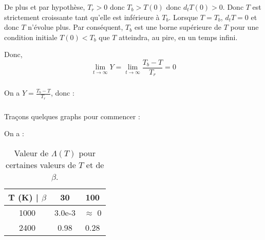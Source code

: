 \documentclass[10pt,a4paper]{report}
\begin{document}
De plus et par hypothèse, $T_r > 0$ donc $T_b > T(0)$ donc $d_t T(0) > 0$. Donc $T$ est strictement croissante tant qu'elle est inférieure à $T_b$. Lorsque $T = T_b$, $d_t T = 0$ et donc $T$ n'évolue plus. Par conséquent, $T_b$ est une borne supérieure de $T$ pour une condition initiale $T(0) < T_b$ que $T$ atteindra, au pire, en un temps infini.

Donc, 
$$\lim_{t \rightarrow \infty} Y = \lim_{t \rightarrow \infty} \frac{T_b-T}{T_r} = 0 $$

\subsubsection{} %

On a $Y= \frac{T_b-T}{T_r}$, donc :


\subsubsection{}%

Traçons quelques graphs pour commencer : 


On a : 

\begin{table}[H]
	\begin{center}
	\begin{tabular}{|c|c|c|}
 		\hline
 		T (K) | $\beta$ & 30 & 100 \\ 
 		\hline
 		1000 & 3.0e-3 & $\approx$ 0 \\ 
 		\hline
 		2400 & 0.98 & 0.28  \\
 		\hline
	\end{tabular}
	\end{center}
 \caption{Valeur de $\Lambda(T)$ pour certaines valeurs de $T$ et de $\beta$.}
\end{table}
\end{document}
